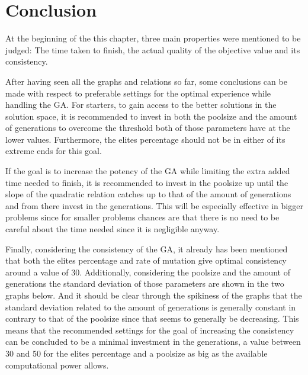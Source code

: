 \section{Conclusion}

\par
At the beginning of the this chapter, three main properties were mentioned to be judged: The time taken to finish, the actual quality of the objective value and its consistency.
\par
After having seen all the graphs and relations so far, some conclusions can be made with respect to preferable settings for the optimal experience while handling the GA.
For starters, to gain access to the better solutions in the solution space, it is recommended to invest in both the poolsize and the amount of generations to overcome the threshold both of those parameters have at the lower values. Furthermore, the elites percentage should not be in either of its extreme ends for this goal.
\par
\vspace{5mm}
If the goal is to increase the potency of the GA while limiting the extra added time needed to finish, it is recommended to invest in the poolsize up until the slope of the quadratic relation catches up to that of the amount of generations and from there invest in the generations. This will be especially effective in bigger problems since for smaller problems chances are that there is no need to be careful about the time needed since it is negligible anyway.
\par
\vspace{5mm}
Finally, considering the consistency of the GA, it already has been mentioned that both the elites percentage and rate of mutation give optimal consistency around a value of 30. Additionally, considering the poolsize and the amount of generations the standard deviation of those parameters are shown in the two graphs below. And it should be clear through the spikiness of the graphs that the standard deviation related to the amount of generations is generally constant in contrary to that of the poolsize since that seems to generally be decreasing. This means that the recommended settings for the goal of increasing the consistency can be concluded to be a minimal investment in the generations, a value between 30 and 50 for the elites percentage and a poolsize as big as the available computational power allows.

